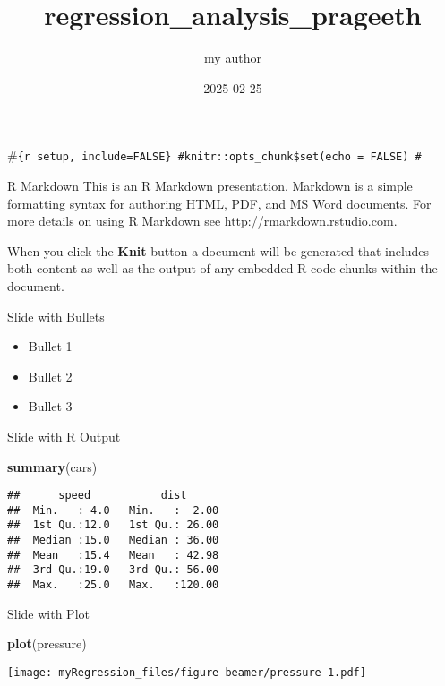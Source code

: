 \documentclass[
  ignorenonframetext,
]{beamer}
\title{regression\_analysis\_prageeth}
\author{my author}
\date{2025-02-25}
\newenvironment{Shaded}{\begin{snugshade}}{\end{snugshade}}
\newcommand{\FunctionTok}[1]{\textcolor[rgb]{0.13,0.29,0.53}{\textbf{#1}}}
\newcommand{\NormalTok}[1]{#1}
\providecommand{\tightlist}{%
  \setlength{\itemsep}{0pt}\setlength{\parskip}{0pt}}
\begin{document}
\frame{\titlepage}

\begin{frame}[fragile]{}
\label{section}
\#\texttt{\{r\ setup,\ include=FALSE\}\ \#knitr::opts\_chunk\$set(echo\ =\ FALSE)\ \#}

\begin{block}{R Markdown}
\label{r-markdown}
This is an R Markdown presentation. Markdown is a simple formatting
syntax for authoring HTML, PDF, and MS Word documents. For more details
on using R Markdown see \url{http://rmarkdown.rstudio.com}.

When you click the \textbf{Knit} button a document will be generated
that includes both content as well as the output of any embedded R code
chunks within the document.
\end{block}

\begin{block}{Slide with Bullets}
\label{slide-with-bullets}
\begin{itemize}
\tightlist
\item
  Bullet 1
\item
  Bullet 2
\item
  Bullet 3
\end{itemize}
\end{block}

\begin{block}{Slide with R Output}
\label{slide-with-r-output}
\begin{Shaded}
\begin{Highlighting}[]
\FunctionTok{summary}\NormalTok{(cars)}
\end{Highlighting}
\end{Shaded}

\begin{verbatim}
##      speed           dist       
##  Min.   : 4.0   Min.   :  2.00  
##  1st Qu.:12.0   1st Qu.: 26.00  
##  Median :15.0   Median : 36.00  
##  Mean   :15.4   Mean   : 42.98  
##  3rd Qu.:19.0   3rd Qu.: 56.00  
##  Max.   :25.0   Max.   :120.00
\end{verbatim}
\end{block}

\begin{block}{Slide with Plot}
\label{slide-with-plot}
\begin{Shaded}
\begin{Highlighting}[]
\FunctionTok{plot}\NormalTok{(pressure)}
\end{Highlighting}
\end{Shaded}

\texttt{[image: myRegression\_files/figure-beamer/pressure-1.pdf]}
\end{block}
\end{frame}
\end{document}
